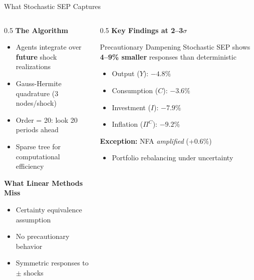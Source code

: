 \documentclass[aspectratio=169,12pt]{beamer}
\begin{document}
\begin{frame}{What Stochastic SEP Captures}

\begin{columns}[T]
\begin{column}{0.5\textwidth}
\textbf{The Algorithm}
\begin{itemize}
\item Agents integrate over \textbf{future} shock realizations
\item Gauss-Hermite quadrature (3 nodes/shock)
\item Order = 20: look 20 periods ahead
\item Sparse tree for computational efficiency
\end{itemize}

\vspace{0.3cm}
\textbf{What Linear Methods Miss}
\begin{itemize}
\item Certainty equivalence assumption
\item No precautionary behavior
\item Symmetric responses to $\pm$ shocks
\end{itemize}
\end{column}

\begin{column}{0.5\textwidth}
\textbf{Key Findings at 2--3$\sigma$}

\vspace{0.2cm}
\begin{block}{Precautionary Dampening}
Stochastic SEP shows \textbf{4--9\% smaller} responses than deterministic
\end{block}

\vspace{0.2cm}
\begin{itemize}
\item Output ($Y$): $-4.8\%$
\item Consumption ($C$): $-3.6\%$
\item Investment ($I$): $-7.9\%$
\item Inflation ($\Pi^C$): $-9.2\%$
\end{itemize}

\vspace{0.2cm}
\textbf{Exception:} NFA \textit{amplified} (+0.6\%)
\begin{itemize}
\item Portfolio rebalancing under uncertainty
\end{itemize}
\end{column}
\end{columns}

\end{frame}
\end{document}
